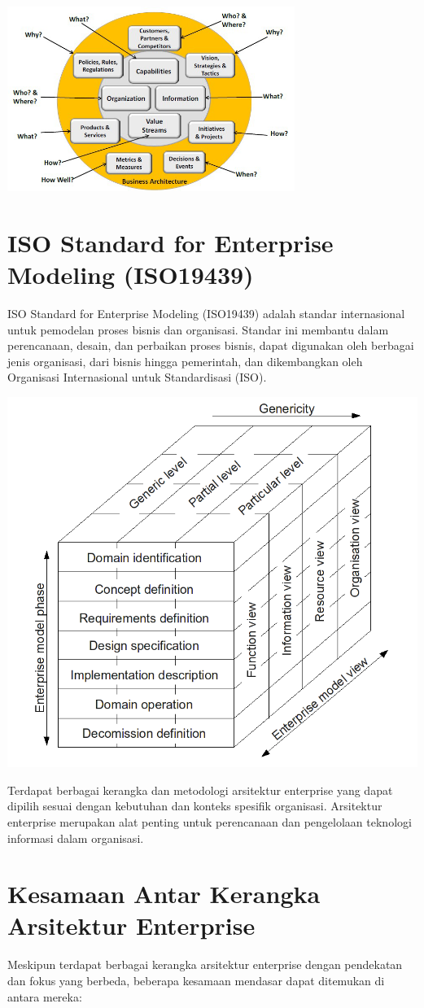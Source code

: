 \begin{center}
	\includegraphics[width=0.7\textwidth]{../figures/bizbok}
\end{center}

\section{ISO Standard for Enterprise Modeling (ISO19439)}
ISO Standard for Enterprise Modeling (ISO19439) adalah standar internasional untuk pemodelan proses bisnis dan organisasi. Standar ini membantu dalam perencanaan, desain, dan perbaikan proses bisnis, dapat digunakan oleh berbagai jenis organisasi, dari bisnis hingga pemerintah, dan dikembangkan oleh Organisasi Internasional untuk Standardisasi (ISO).

\begin{center}
	\includegraphics[width=.45\textwidth]{../figures/iso19439}
\end{center}

Terdapat berbagai kerangka dan metodologi arsitektur enterprise yang dapat dipilih sesuai dengan kebutuhan dan konteks spesifik organisasi. Arsitektur enterprise merupakan alat penting untuk perencanaan dan pengelolaan teknologi informasi dalam organisasi.

\section{Kesamaan Antar Kerangka Arsitektur Enterprise}
Meskipun terdapat berbagai kerangka arsitektur enterprise dengan pendekatan dan fokus yang berbeda, beberapa kesamaan mendasar dapat ditemukan di antara mereka:

